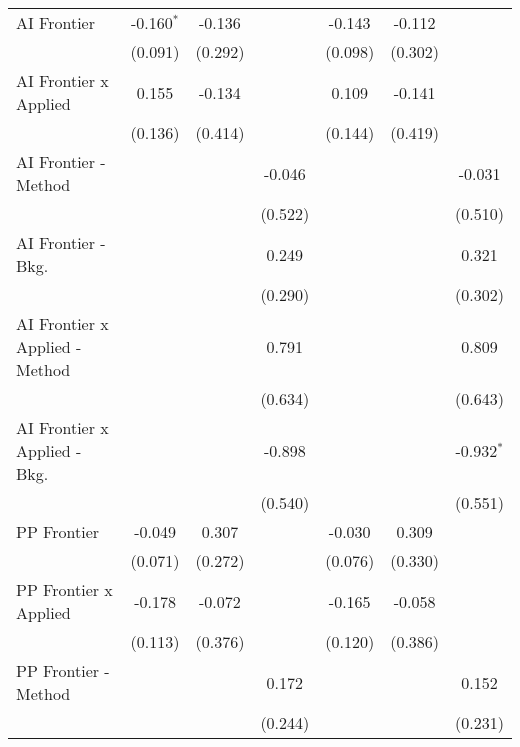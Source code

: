 \begin{tabular}{lcccccc}
   AI Frontier                    & -0.160$^{*}$  & -0.136  &              & -0.143       & -0.112  &   \\   
                                  & (0.091)       & (0.292) &              & (0.098)      & (0.302) &   \\   
   AI Frontier x Applied          & 0.155         & -0.134  &              & 0.109        & -0.141  &   \\   
                                  & (0.136)       & (0.414) &              & (0.144)      & (0.419) &   \\   
   AI Frontier - Method           &               &         & -0.046       &              &         & -0.031\\   
                                  &               &         & (0.522)      &              &         & (0.510)\\   
   AI Frontier - Bkg.             &               &         & 0.249        &              &         & 0.321\\   
                                  &               &         & (0.290)      &              &         & (0.302)\\   
   AI Frontier x Applied - Method &               &         & 0.791        &              &         & 0.809\\   
                                  &               &         & (0.634)      &              &         & (0.643)\\   
   AI Frontier x Applied - Bkg.   &               &         & -0.898       &              &         & -0.932$^{*}$\\   
                                  &               &         & (0.540)      &              &         & (0.551)\\   
   PP Frontier                    & -0.049        & 0.307   &              & -0.030       & 0.309   &   \\   
                                  & (0.071)       & (0.272) &              & (0.076)      & (0.330) &   \\   
   PP Frontier x Applied          & -0.178        & -0.072  &              & -0.165       & -0.058  &   \\   
                                  & (0.113)       & (0.376) &              & (0.120)      & (0.386) &   \\   
   PP Frontier - Method           &               &         & 0.172        &              &         & 0.152\\   
                                  &               &         & (0.244)      &              &         & (0.231)\\   

\end{tabular}
